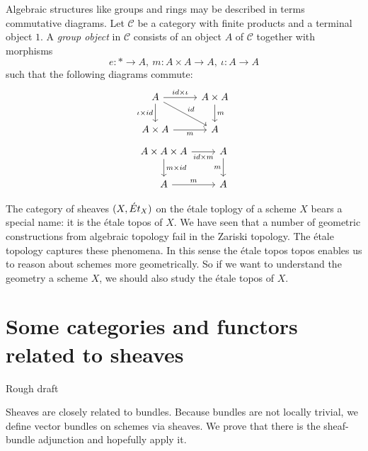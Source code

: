 \begin{definition}
Algebraic structures like groups and rings may be described in terms commutative diagrams. Let $\mathcal{C}$ be a category with finite products and a terminal object $1$. A \textit{group object} in $\mathcal{C}$ consists of an object $A$ of $\mathcal{C}$ together with morphisms
\[e: * \to A,\ m : A \times A \to A,\ \iota: A \to A \]
such that the following diagrams commute:
\[
	\begin{tikzcd}
		A & {A \times A} \\
		{A \times A} & A
		\arrow["{\iota \times id}"', from=1-1, to=2-1]
		\arrow["{id \times \iota}", from=1-1, to=1-2]
		\arrow["m", from=1-2, to=2-2]
		\arrow["m"', from=2-1, to=2-2]
		\arrow["id", from=1-1, to=2-2]
	\end{tikzcd}
\]
\[
	\begin{tikzcd}
		{A \times A \times A} & A \\
		A & A
		\arrow["{id \times m}"', from=1-1, to=1-2]
		\arrow["m"', from=1-2, to=2-2]
		\arrow["{m \times id}", from=1-1, to=2-1]
		\arrow["m", from=2-1, to=2-2]
	\end{tikzcd}
\]
\end{definition}

The category of sheaves $\mathcal{(}X, \acute{E}t_X)$ on the \'etale toplogy of a scheme $X$ bears a special name: it is the \'etale topos of $X$. We have seen that a number of geometric constructions from algebraic topology fail in the Zariski topology. The \'etale topology captures these phenomena. In this sense the \'etale topos topos enables us to reason about schemes more geometrically. So if we want to understand the geometry a scheme $X$, we should also study the \'etale topos of $X$.

\section{Some categories and functors related to sheaves}

Rough draft \par
Sheaves are closely related to bundles. Because bundles are not locally trivial, we define vector bundles on schemes via sheaves. We prove that there is the sheaf-bundle adjunction and hopefully apply it.

